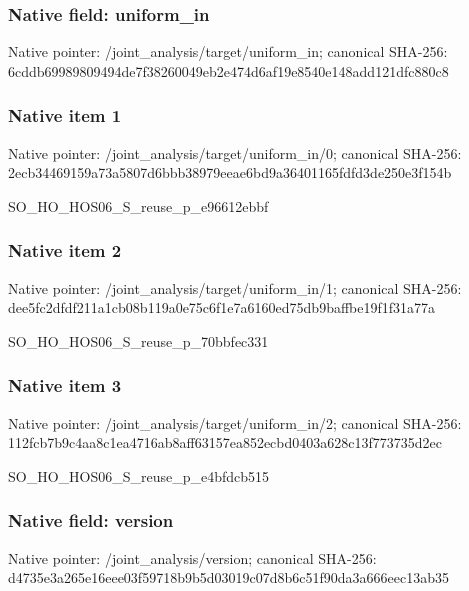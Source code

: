 \documentclass[10pt,a4paper]{article}
\begin{document}
\subsubsection{Native field: uniform\_\allowbreak{}in}
Native pointer: /joint\_\allowbreak{}analysis/target/uniform\_\allowbreak{}in; canonical SHA-256: 6cddb69989809494de7f38260049eb2e474d6af19e8540e148add121dfc880c8

\subsubsection{Native item 1}
Native pointer: /joint\_\allowbreak{}analysis/target/uniform\_\allowbreak{}in/0; canonical SHA-256: 2ecb34469159a73a5807d6bbb38979eeae6bd9a36401165fdfd3de250e3f154b

\begingroup\raggedright\sloppy SO\_\allowbreak{}HO\_\allowbreak{}HOS06\_\allowbreak{}S\_\allowbreak{}reuse\_\allowbreak{}p\_\allowbreak{}e96612ebbf\par\endgroup

\subsubsection{Native item 2}
Native pointer: /joint\_\allowbreak{}analysis/target/uniform\_\allowbreak{}in/1; canonical SHA-256: dee5fc2dfdf211a1cb08b119a0e75c6f1e7a6160ed75db9baffbe19f1f31a77a

\begingroup\raggedright\sloppy SO\_\allowbreak{}HO\_\allowbreak{}HOS06\_\allowbreak{}S\_\allowbreak{}reuse\_\allowbreak{}p\_\allowbreak{}70bbfec331\par\endgroup

\subsubsection{Native item 3}
Native pointer: /joint\_\allowbreak{}analysis/target/uniform\_\allowbreak{}in/2; canonical SHA-256: 112fcb7b9c4aa8c1ea4716ab8aff63157ea852ecbd0403a628c13f773735d2ec

\begingroup\raggedright\sloppy SO\_\allowbreak{}HO\_\allowbreak{}HOS06\_\allowbreak{}S\_\allowbreak{}reuse\_\allowbreak{}p\_\allowbreak{}e4bfdcb515\par\endgroup

\subsubsection{Native field: version}
Native pointer: /joint\_\allowbreak{}analysis/version; canonical SHA-256: d4735e3a265e16eee03f59718b9b5d03019c07d8b6c51f90da3a666eec13ab35
\end{document}

